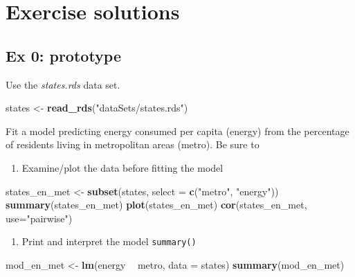 \documentclass[]{book}
\newenvironment{Shaded}{\begin{snugshade}}{\end{snugshade}}
\newcommand{\DataTypeTok}[1]{\textcolor[rgb]{0.13,0.29,0.53}{#1}}
\newcommand{\KeywordTok}[1]{\textcolor[rgb]{0.13,0.29,0.53}{\textbf{#1}}}
\newcommand{\NormalTok}[1]{#1}
\newcommand{\OperatorTok}[1]{\textcolor[rgb]{0.81,0.36,0.00}{\textbf{#1}}}
\newcommand{\StringTok}[1]{\textcolor[rgb]{0.31,0.60,0.02}{#1}}
\providecommand{\tightlist}{%
  \setlength{\itemsep}{0pt}\setlength{\parskip}{0pt}}
\begin{document}
\hypertarget{exercise-solutions-1}{%
\section{Exercise solutions}\label{exercise-solutions-1}}

\hypertarget{ex-0-prototype-1}{%
\subsection{Ex 0: prototype}\label{ex-0-prototype-1}}

Use the \emph{states.rds} data set.

\begin{Shaded}
\begin{Highlighting}[]
\NormalTok{  states <-}\StringTok{ }\KeywordTok{read_rds}\NormalTok{(}\StringTok{"dataSets/states.rds"}\NormalTok{)}
\end{Highlighting}
\end{Shaded}

Fit a model predicting energy consumed per capita (energy) from the percentage of residents living in metropolitan areas (metro). Be sure to

\begin{enumerate}
\def\labelenumi{\arabic{enumi}.}
\tightlist
\item
  Examine/plot the data before fitting the model
\end{enumerate}

\begin{Shaded}
\begin{Highlighting}[]
\NormalTok{  states_en_met <-}\StringTok{ }\KeywordTok{subset}\NormalTok{(states, }\DataTypeTok{select =} \KeywordTok{c}\NormalTok{(}\StringTok{"metro"}\NormalTok{, }\StringTok{"energy"}\NormalTok{))}
  \KeywordTok{summary}\NormalTok{(states_en_met)}
  \KeywordTok{plot}\NormalTok{(states_en_met)}
  \KeywordTok{cor}\NormalTok{(states_en_met, }\DataTypeTok{use=}\StringTok{"pairwise"}\NormalTok{)}
\end{Highlighting}
\end{Shaded}

\begin{enumerate}
\def\labelenumi{\arabic{enumi}.}
\setcounter{enumi}{1}
\tightlist
\item
  Print and interpret the model \texttt{summary()}
\end{enumerate}

\begin{Shaded}
\begin{Highlighting}[]
\NormalTok{  mod_en_met <-}\StringTok{ }\KeywordTok{lm}\NormalTok{(energy }\OperatorTok{~}\StringTok{ }\NormalTok{metro, }\DataTypeTok{data =}\NormalTok{ states)}
  \KeywordTok{summary}\NormalTok{(mod_en_met)}
\end{Highlighting}
\end{Shaded}
\end{document}
